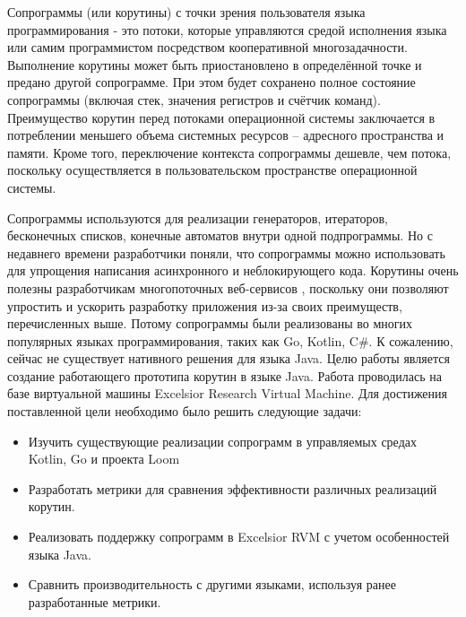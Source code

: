 
Сопрограммы (или корутины) с точки зрения пользователя языка программирования - это потоки, которые управляются средой исполнения языка или самим программистом посредством кооперативной многозадачности. Выполнение корутины может быть приостановлено в определённой точке и предано другой сопрограмме. При этом будет сохранено полное состояние сопрограммы (включая стек, значения регистров и счётчик команд). 
Преимущество корутин перед потоками операционной системы заключается в потреблении меньшего объема системных ресурсов – адресного
пространства и памяти. Кроме того, переключение контекста сопрограммы дешевле, чем потока, поскольку осуществляется в
пользовательском пространстве операционной системы. 
\par
Сопрограммы используются для реализации генераторов, итераторов, бесконечных списков, конечные автоматов внутри одной
подпрограммы. Но с недавнего времени разработчики поняли, что сопрограммы можно использовать для упрощения написания
асинхронного и неблокирующего кода. Корутины очень полезны разработчикам многопоточных веб-сервисов , поскольку они 
позволяют упростить и ускорить разработку приложения из-за своих преимуществ, перечисленных выше. Потому сопрограммы 
были реализованы во многих популярных языках программирования, таких как Go, Kotlin, C\#.
К сожалению, сейчас не существует нативного решения для языка Java.
Целю работы является создание работающего прототипа корутин в языке Java. Работа проводилась на базе виртуальной машины Excelsior Research Virtual Machine. Для достижения поставленной цели необходимо было решить следующие задачи:
\begin{itemize}
	\item Изучить существующие реализации сопрограмм в управляемых средах Kotlin, Go и проекта Loom
	\item Разработать метрики для сравнения эффективности различных реализаций корутин.
	\item Реализовать поддержку сопрограмм в Excelsior RVM с учетом особенностей языка Java. 
	\item Сравнить производительность с другими языками, используя ранее разработанные метрики.
\end{itemize}

\clearpage

